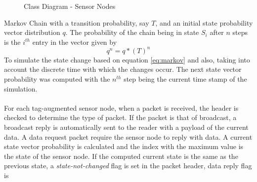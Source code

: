 \begin{centering}
\begin{figure}[h!]
    \caption{Class Diagram - Sensor Nodes}
    \label{fig:SensorNodes}
\end{figure}
\end{centering}
Markov Chain with a transition probability, say \textbf{$T$}, and an initial state
probability vector distribution \textbf{$q$}. The probability of the chain being in
state $S_i$ after $n$ steps is the $i^{th}$ entry in the vector given by
\begin{equation}
    q^n = q*( T)^n
    \label{eq:markov}
\end{equation}
To simulate the state change based on equation \ref{eq:markov} and also, taking into
account the discrete time with which the changes occur. The next state vector
probability was computed with the $n^{th}$ step being the current time stamp of the
simulation.\\\\
For each tag-augmented sensor node, when a packet is received, the header is checked
to determine the type of packet. If the packet is that of broadcast, a broadcast
reply is automatically sent to the reader with a payload of the current data.
A data request packet require the sensor node to reply with data. A current state
vector probability is calculated and the index with the maximum value is the state 
of the sensor node. If the computed current state is the same as the previous state,
a \textit{state-not-changed} flag is set in the packet header, data reply flag is 
